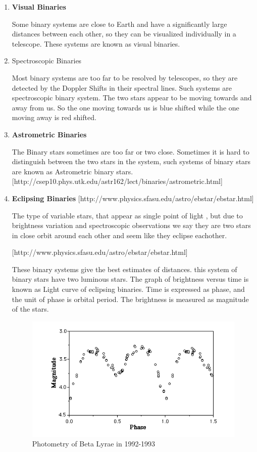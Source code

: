 \documentclass{article}
\begin{document}
\begin{enumerate}

\item\textbf{Visual Binaries}

Some binary systems are close to Earth and have a significantly large distances between each    other, so they can be visualized individually in a telescope. These systems are known as visual binaries. 
  
\item {Spectroscopic Binaries }

Most binary systems are too far to be resolved by telescopes, so they are detected by the Doppler Shifts in their spectral lines. Such systems are spectroscopic binary system. The two stars appear to be moving towards and away from us. So the one moving towards us is blue shifted while the one moving away is red shifted.


\item\textbf{ Astrometric Binaries}

The Binary stars sometimes are too far or two close. Sometimes it is hard to distinguish between the two stars in the system, such systems of binary stars are known as Astrometric binary stars.
[http://csep10.phys.utk.edu/astr162/lect/binaries/astrometric.html]

\item \textbf{Eclipsing Binaries}
[http://www.physics.sfasu.edu/astro/ebstar/ebstar.html]

The type of variable stars, that appear as single point of light , but due to brightness variation and spectroscopic observations we say they are two stars in close orbit around each other and seem like they eclipse eachother. 
 
[http://www.physics.sfasu.edu/astro/ebstar/ebstar.html]

These binary systems give the best estimates of distances. this system of binary stars have two luminous stars. The graph of brightness versus time is known as Light curve of eclipsing binaries. Time is expressed as phase, and the unit of phase is orbital period. The brightness is measured as magnitude of the stars.
\begin{figure}
\centering
\includegraphics[scale=0.5]{LC}
\caption{Photometry of Beta Lyrae in 1992-1993}
\end{figure}

\end{enumerate}
\end{document}
